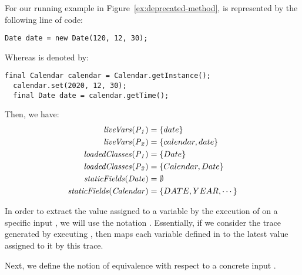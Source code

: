 \documentclass[runningheads,a4paper]{llncs}
\begin{document}
\begin{example}\label{ex:defs}
  For our running example in Figure~\ref{ex:deprecated-method},
   is represented by the following line of code:

\begin{lstlisting}[mathescape=true,showstringspaces=false]
  Date date = new Date(120, 12, 30);
\end{lstlisting}

Whereas  is denoted by:

\begin{lstlisting}[mathescape=true,showstringspaces=false]
  final Calendar calendar = Calendar.getInstance();
  calendar.set(2020, 12, 30);
  final Date date = calendar.getTime();
\end{lstlisting}
  
Then, we have:
\[
\begin{aligned}[t]
  \mathit{{liveVars(P_1)}} &= \{date\}\\
  \mathit{{liveVars(P_2)}} &= \{calendar, date\}\\  
  \mathit{{loadedClasses(P_1)}} &= \{Date\} \\
  \mathit{{loadedClasses(P_2)}} &= \{Calendar, Date\} \\  
  \mathit{{staticFields(Date)}} &= \emptyset\\
  \mathit{{staticFields(Calendar)}} &= \{DATE, YEAR, \cdots\}  
\end{aligned}
\]
\end{example}


In order to extract the value assigned to a variable  by the execution of  on a specific input ,
we will use the notation . Essentially, if we consider the trace generated by executing ,
then  maps each variable defined in  to the latest value assigned to it by this trace.


Next, we define the notion of equivalence with respect to a concrete input .
\end{document}
